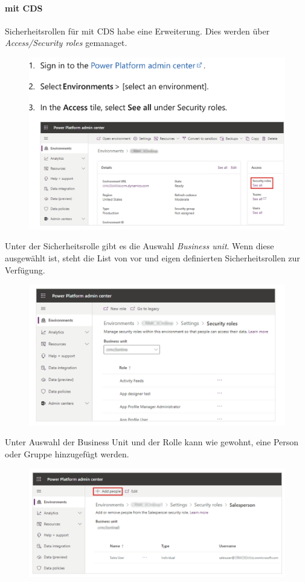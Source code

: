\paragraph*{\Env mit CDS}
Sicherheitsrollen für \Env mit \gls{CDS} habe eine Erweiterung. Dies werden über \textit{Access/Security roles} gemanaget.
\begin{figure}[H]
	\centering
	\includegraphics[scale = 0.3]{attachment/chapter_13/Scc013}
\end{figure}
Unter der Sicherheitsrolle gibt es die Auswahl \textit{Business unit}. Wenn diese ausgewählt ist, steht die List von vor und eigen definierten Sicherheitsrollen zur Verfügung.
\begin{figure}[H]
	\centering
	\includegraphics[scale = 0.3]{attachment/chapter_13/Scc014}
\end{figure}
Unter Auswahl der Business Unit und der Rolle kann wie gewohnt, eine Person oder Gruppe hinzugefügt werden.
\begin{figure}[H]
	\centering
	\includegraphics[scale = 0.3]{attachment/chapter_13/Scc015}
\end{figure}

